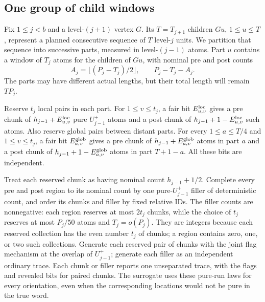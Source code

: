 \subsection{One group of child windows}\label{sec:group-partition}

Fix $1\le j<b$ and a level-$(j+1)$ vertex $G$.  Its $T=T_{j+1}$ children $Gu$, $1\le u\le T$, represent a planned consecutive sequence of $T$ level-$j$ units.  We partition that sequence into successive parts, measured in level-$(j-1)$ atoms.  Part $u$ contains a window of $T_j$ atoms for the children of $Gu$, with nominal pre and post counts
\[
 A_j=\lfloor(P_j-T_j)/2\rfloor,
 \qquad P_j-T_j-A_j.
\]
The parts may have different actual lengths, but their total length will remain $TP_j$.

Reserve $t_j$ local pairs in each part.  For $1\le v\le t_j$, a fair bit $E^{\rm loc}_{u,v}$ gives a pre chunk of $h_{j-1}+E^{\rm loc}_{u,v}$ pure $U_{j-1}^+$ atoms and a post chunk of $h_{j-1}+1-E^{\rm loc}_{u,v}$ such atoms.  Also reserve global pairs between distant parts.  For every $1\le a\le T/4$ and $1\le v\le t_j$, a fair bit $E^{\rm glob}_{a,v}$ gives a pre chunk of $h_{j-1}+E^{\rm glob}_{a,v}$ atoms in part $a$ and a post chunk of $h_{j-1}+1-E^{\rm glob}_{a,v}$ atoms in part $T+1-a$.  All these bits are independent.

Treat each reserved chunk as having nominal count $h_{j-1}+1/2$.  Complete every pre and post region to its nominal count by one pure-$U_{j-1}^+$ filler of deterministic count, and order its chunks and filler by fixed relative IDs.  The filler counts are nonnegative: each region reserves at most $2t_j$ chunks, while the choice of $t_j$ reserves at most $P_j/50$ atoms and $T_j=o(P_j)$.  They are integers because each reserved collection has the even number $t_j$ of chunks; a region contains zero, one, or two such collections.  Generate each reserved pair of chunks with the joint flag mechanism at the overlap of $U_{j-1}^+$; generate each filler as an independent ordinary trace.  Each chunk or filler reports one unseparated trace, with the flags and revealed bits for paired chunks.  The surrogate uses these pure-run laws for every orientation, even when the corresponding locations would not be pure in the true word.

